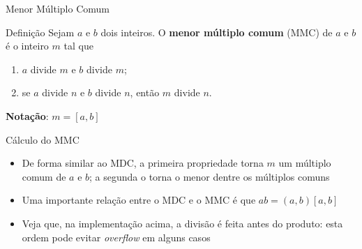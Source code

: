 \begin{frame}[fragile]{Menor Múltiplo Comum}

    \begin{block}{Definição}
        Sejam $a$ e $b$ dois inteiros. O \textbf{menor múltiplo comum} (MMC) de $a$ e $b$ é o inteiro $m$ tal que

        \begin{enumerate}
            \item $a$ divide $m$ e $b$ divide $m$;
            \item se $a$ divide $n$ e $b$ divide $n$, então $m$ divide $n$.
        \end{enumerate}

        \vspace{0.2in}
        \textbf{Notação}: $m = [a, b]$
    \end{block}

\end{frame}

\begin{frame}[fragile]{Cálculo do MMC}

    \begin{itemize}
        \item De forma similar ao MDC, a primeira propriedade torna $m$ um múltiplo comum de $a$ e $b$; a segunda o torna o menor dentre os múltiplos comuns

        \item Uma importante relação entre o MDC e o MMC é que $ab = (a,b)[a,b]$


        \item Veja que, na implementação acima, a divisão é feita antes do produto: esta ordem pode evitar \textit{overflow} em alguns casos
    \end{itemize}

\end{frame}
